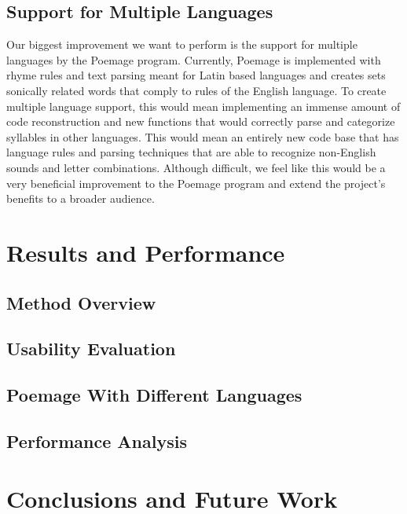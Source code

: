 \documentclass[journal]{vgtc}                %
\begin{document}
\subsection{Support for Multiple Languages}
Our biggest improvement we want to perform is the support for multiple languages by the Poemage program. Currently, Poemage is implemented with rhyme rules and text parsing meant for Latin based languages and creates sets sonically related words that comply to rules of the English language. To create multiple language support, this would mean implementing an immense amount of code reconstruction and new functions that would correctly parse and categorize syllables in other languages. This would mean an entirely new code base that has language rules and parsing techniques that are able to recognize non-English sounds and letter combinations. Although difficult, we feel like this would be a very beneficial improvement to the Poemage program and extend the project’s benefits to a broader audience.




\section{Results and Performance} \label{results}
\subsection{Method Overview}

\subsection{Usability Evaluation}

\subsection{Poemage With Different Languages}

\subsection{Performance Analysis}

\section{Conclusions and Future Work} \label{conclusion}


\newpage
%

%
%
%


\end{document}
